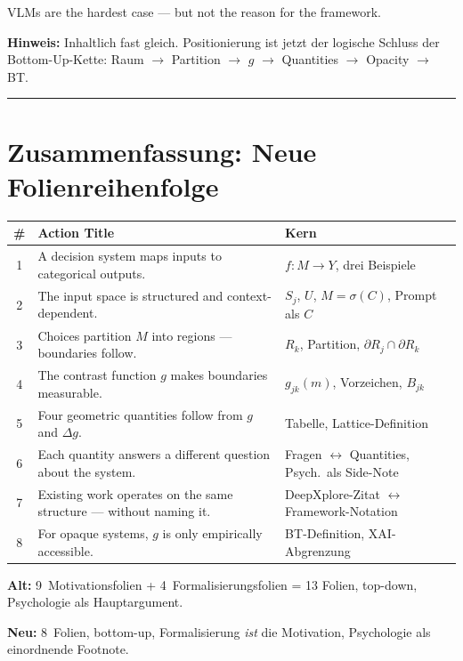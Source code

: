 \documentclass[11pt, a4paper]{article}
\newcommand{\slidenote}[1]{{\small\color{accent}\textbf{Hinweis:} #1}\par}
\begin{document}
VLMs are the hardest case --- but not the reason for the framework.

\slidenote{Inhaltlich fast gleich. Positionierung ist jetzt der logische Schluss der Bottom-Up-Kette: Raum $\to$ Partition $\to$ $g$ $\to$ Quantities $\to$ Opacity $\to$ BT.}

\bigskip\hrule\bigskip

\section*{Zusammenfassung: Neue Folienreihenfolge}

\begin{center}
\renewcommand{\arraystretch}{1.3}
\begin{tabular}{clp{6cm}}
\textbf{\#} & \textbf{Action Title} & \textbf{Kern} \\
\hline
1 & A decision system maps inputs to categorical outputs. & $f: M \to Y$, drei Beispiele \\
2 & The input space is structured and context-dependent. & $S_j$, $U$, $M = \sigma(C)$, Prompt als $C$ \\
3 & Choices partition $M$ into regions --- boundaries follow. & $R_k$, Partition, $\partial R_j \cap \partial R_k$ \\
4 & The contrast function $g$ makes boundaries measurable. & $g_{jk}(m)$, Vorzeichen, $B_{jk}$ \\
5 & Four geometric quantities follow from $g$ and $\Delta g$. & Tabelle, Lattice-Definition \\
6 & Each quantity answers a different question about the system. & Fragen $\leftrightarrow$ Quantities, Psych.\ als Side-Note \\
7 & Existing work operates on the same structure --- without naming it. & DeepXplore-Zitat $\leftrightarrow$ Framework-Notation \\
8 & For opaque systems, $g$ is only empirically accessible. & BT-Definition, XAI-Abgrenzung \\
\end{tabular}
\end{center}

\textbf{Alt:} 9~Motivationsfolien + 4~Formalisierungsfolien = 13 Folien, top-down, Psychologie als Hauptargument.

\textbf{Neu:} 8~Folien, bottom-up, Formalisierung \emph{ist} die Motivation, Psychologie als einordnende Footnote.
\end{document}
